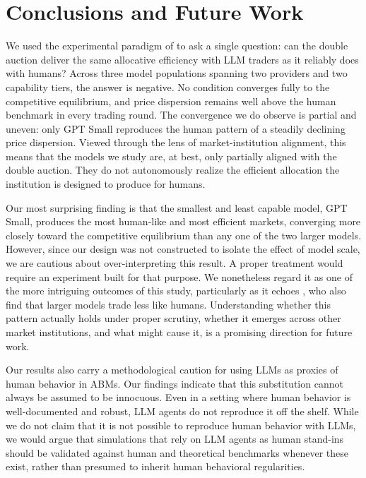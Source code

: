 \documentclass[letterpaper]{article} %
\begin{document}
\section{Conclusions and Future Work}
\label{sec:discussion}

We used the experimental paradigm of \citet{smithExperimentalStudyCompetitive1962} to ask a single question: can the double auction deliver the same allocative efficiency with LLM traders as it reliably does with humans? Across three model populations spanning two providers and two capability tiers, the answer is negative. No condition converges fully to the competitive equilibrium, and price dispersion remains well above the human benchmark in every trading round. The convergence we do observe is partial and uneven: only GPT Small reproduces the human pattern of a steadily declining price dispersion. Viewed through the lens of market-institution alignment, this means that the models we study are, at best, only partially aligned with the double auction. They do not autonomously realize the efficient allocation the institution is designed to produce for humans.

Our most surprising finding is that the smallest and least capable model, GPT Small, produces the most human-like and most efficient markets, converging more closely toward the competitive equilibrium than any one of the two larger models. However, since our design was not constructed to isolate the effect of model scale, we are cautious about over-interpreting this result. A proper treatment would require an experiment built for that purpose. We nonetheless regard it as one of the more intriguing outcomes of this study, particularly as it echoes \citet{wang2025large}, who also find that larger models trade less like humans. Understanding whether this pattern actually holds under proper scrutiny, whether it emerges across other market institutions, and what might cause it, is a promising direction for future work.

Our results also carry a methodological caution for using LLMs as proxies of human behavior in ABMs. Our findings indicate that this substitution cannot always be assumed to be innocuous. Even in a setting where human behavior is well-documented and robust, LLM agents do not reproduce it off the shelf. While we do not claim that it is not possible to reproduce human behavior with LLMs, we would argue that simulations that rely on LLM agents as human stand-ins should be validated against human and theoretical benchmarks whenever these exist, rather than presumed to inherit human behavioral regularities.
\end{document}
